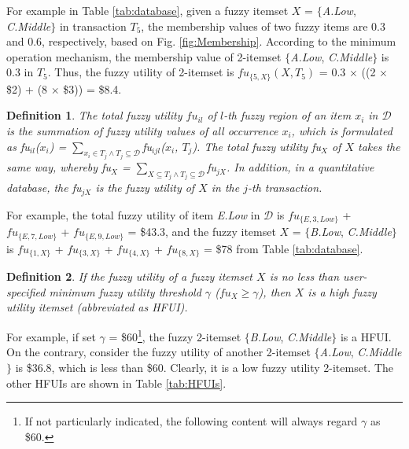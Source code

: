 \documentclass[journal]{IEEEtran}
\newtheorem{definition}{Definition}[section]
\begin{document}
For example in Table \ref{tab:database}, given a fuzzy itemset $X$ = $\{$\textit{A.Low}, \textit{C.Middle}$\}$ in transaction $T_5$, the membership values of two fuzzy items are 0.3 and 0.6, respectively, based on Fig. \ref{fig:Membership}. According to the minimum operation mechanism, the membership value of 2-itemset $\{$\textit{A.Low}, \textit{C.Middle}$\}$ is 0.3 in $T_5$. Thus, the fuzzy utility of 2-itemset is $fu_{\{5, X\}}(X, T_5)$ = 0.3 $\times$ ((2 $\times$ \$2) + (8 $\times$ \$3)) = \$8.4.

\begin{definition}
	\rm The total fuzzy utility $fu_{il}$ of $l$-th fuzzy region of an item $x_i$ in $\mathcal{D}$ is the summation of fuzzy utility values of all occurrence $x_i$, which is formulated as \textit{fu}$_{il}$($x_i$) = $\sum_{x_i \in T_j \land T_j \subseteq \mathcal{D}}$\textit{fu}$_{ijl}$($x_i$, $T_j$). The total fuzzy utility \textit{fu}$_{X}$ of $X$ takes the same way, whereby \textit{fu}$_{X}$ = $\sum_{X \subseteq T_j \land T_j \subseteq \mathcal{D}}$\textit{fu}$_{jX}$. In addition, in a quantitative database, the \textit{fu}$_{jX}$ is the fuzzy utility of $X$ in the $j$-th transaction.
\end{definition}

For example, the total fuzzy utility of item \textit{E.Low} in $\mathcal{D}$ is $fu_{\{E, 3, Low\}}$ + $fu_{\{E, 7, Low\}}$ + $fu_{\{E, 9, Low\}}$ = \$43.3, and the fuzzy itemset $X$ = $\{$\textit{B.Low}, \textit{C.Middle}$\}$ is $fu_{\{1, X\}}$ + $fu_{\{3, X\}}$ + $fu_{\{4, X\}}$ + $fu_{\{8, X\}}$ = \$78 from Table \ref{tab:database}.

\begin{definition}
	\rm If the fuzzy utility of a fuzzy itemset $X$ is no less than user-specified minimum fuzzy utility threshold $\gamma$ ($fu_{X} \ge \gamma$), then $X$ is a high fuzzy utility itemset (abbreviated as HFUI).
\end{definition}

For example, if set $\gamma$ = \$60\footnote{If not particularly indicated, the following content will always regard $\gamma$ as \$60.}, the fuzzy 2-itemset $\{$\textit{B.Low}, \textit{C.Middle}$\}$ is a HFUI. On the contrary, consider the fuzzy utility of another 2-itemset $\{$\textit{A.Low}, \textit{C.Middle}$\}$ is \$36.8, which is less than \$60. Clearly, it is a low fuzzy utility 2-itemset. The other HFUIs are shown in Table \ref{tab:HFUIs}. 
\end{document}
